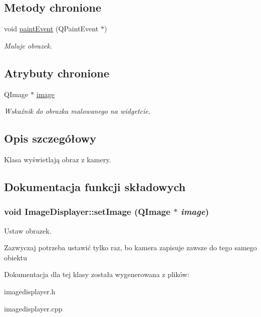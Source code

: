 \subsection*{Metody chronione}
\begin{DoxyCompactItemize}
\item 
\hypertarget{class_image_displayer_ab892b4b10728fa072aedfa5a315cd319}{
void \hyperlink{class_image_displayer_ab892b4b10728fa072aedfa5a315cd319}{paintEvent} (QPaintEvent $\ast$)}
\label{class_image_displayer_ab892b4b10728fa072aedfa5a315cd319}

\begin{DoxyCompactList}\small\item\em Maluje obrazek. \item\end{DoxyCompactList}\end{DoxyCompactItemize}
\subsection*{Atrybuty chronione}
\begin{DoxyCompactItemize}
\item 
\hypertarget{class_image_displayer_a425fc06c5474754684575cd80e378bd1}{
QImage $\ast$ \hyperlink{class_image_displayer_a425fc06c5474754684575cd80e378bd1}{image}}
\label{class_image_displayer_a425fc06c5474754684575cd80e378bd1}

\begin{DoxyCompactList}\small\item\em Wskaźnik do obrazka malowanego na widgetcie. \item\end{DoxyCompactList}\end{DoxyCompactItemize}


\subsection{Opis szczegółowy}
Klasa wyświetlają obraz z kamery. 

\subsection{Dokumentacja funkcji składowych}
\hypertarget{class_image_displayer_aa801ce426124fdd201a56e44e8b24610}{
\subsubsection[{setImage}]{\setlength{\rightskip}{0pt plus 5cm}void ImageDisplayer::setImage (QImage $\ast$ {\em image})}}
\label{class_image_displayer_aa801ce426124fdd201a56e44e8b24610}


Ustaw obrazek. 

Zazwyczaj potrzeba ustawić tylko raz, bo kamera zapisuje zawsze do tego samego obiektu 

Dokumentacja dla tej klasy została wygenerowana z plików:\begin{DoxyCompactItemize}
\item 
imagedisplayer.h\item 
imagedisplayer.cpp\end{DoxyCompactItemize}
